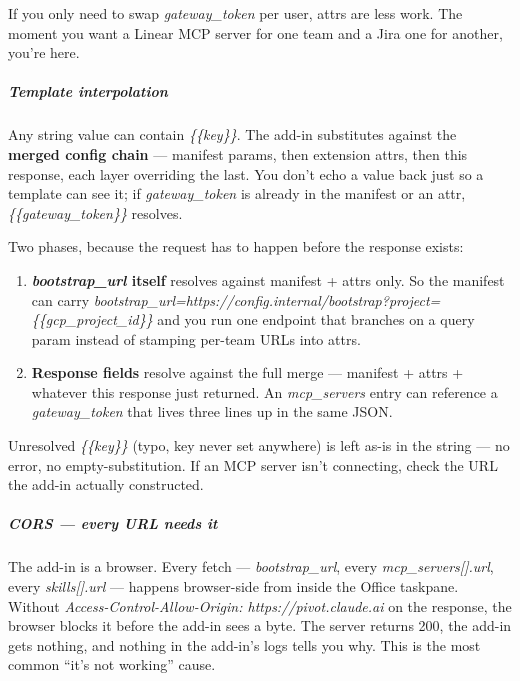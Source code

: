 \documentclass[11pt]{article}
\begin{document}
If you only need to swap \emph{gateway\_\allowbreak{}token} per user, attrs are less work. The moment you want a Linear MCP server for one team and a Jira one for another, you're here.


\subparagraph{Template interpolation}\mbox{}\par

Any string value can contain \emph{\{\{key\}\}}. The add-in substitutes against the \textbf{merged config chain} — manifest params, then extension attrs, then this response, each layer overriding the last. You don't echo a value back just so a template can see it; if \emph{gateway\_\allowbreak{}token} is already in the manifest or an attr, \emph{\{\{gateway\_\allowbreak{}token\}\}} resolves.


Two phases, because the request has to happen before the response exists:


\begin{enumerate}[leftmargin=*,itemsep=2pt,topsep=2pt]
\item {} \textbf{\emph{bootstrap\_\allowbreak{}url} itself} resolves against manifest + attrs only. So the manifest can carry \emph{bootstrap\_\allowbreak{}url=https://config.internal/bootstrap?project=\{\{gcp\_\allowbreak{}project\_\allowbreak{}id\}\}} and you run one endpoint that branches on a query param instead of stamping per-team URLs into attrs.
\item {} \textbf{Response fields} resolve against the full merge — manifest + attrs + whatever this response just returned. An \emph{mcp\_\allowbreak{}servers} entry can reference a \emph{gateway\_\allowbreak{}token} that lives three lines up in the same JSON.
\end{enumerate}

Unresolved \emph{\{\{key\}\}} (typo, key never set anywhere) is left as-is in the string — no error, no empty-substitution. If an MCP server isn't connecting, check the URL the add-in actually constructed.


\subparagraph{CORS — every URL needs it}\mbox{}\par

The add-in is a browser. Every fetch — \emph{bootstrap\_\allowbreak{}url}, every \emph{mcp\_\allowbreak{}servers[].url}, every \emph{skills[].url} — happens browser-side from inside the Office taskpane. Without \emph{Access-Control-Allow-Origin: https://pivot.claude.ai} on the response, the browser blocks it before the add-in sees a byte. The server returns 200, the add-in gets nothing, and nothing in the add-in's logs tells you why. This is the most common ``it's not working'' cause.
\end{document}
